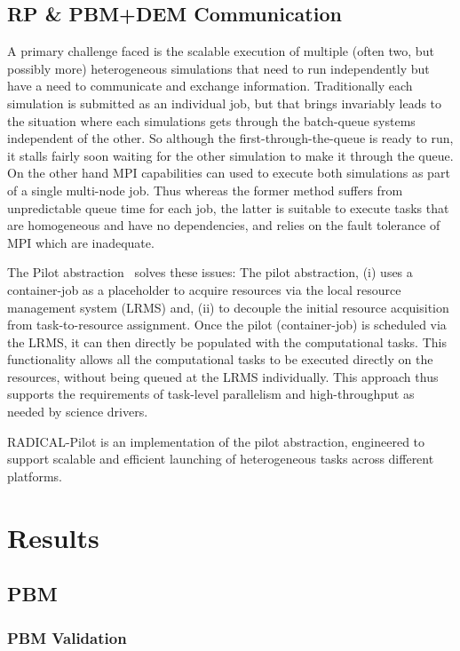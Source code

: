 \documentclass[preprint,11pt,authoryear]{elsarticle}
\begin{document}
	  
	  \subsection{RP \& PBM+DEM Communication}
	

A primary challenge faced is the scalable execution of multiple (often two,
but possibly more) heterogeneous simulations that need to run independently
but have a need to communicate and exchange information. Traditionally each
simulation is submitted as an individual job, but that brings invariably leads
to the situation where each simulations gets through the batch-queue systems
independent of the other. So although the first-through-the-queue is ready to
run, it stalls fairly soon waiting for the other simulation to make it through
the queue.  On the other hand MPI capabilities can used to  execute both
simulations as part of a single multi-node job.  Thus whereas the former
method suffers from unpredictable queue time for each job, the latter is
suitable to execute tasks that are homogeneous and have no dependencies, and
relies on the fault tolerance of MPI which are inadequate.


The Pilot abstraction~\cite{review_pilotreview} solves these issues:  The
pilot abstraction, (i) uses a container-job as a placeholder to acquire
resources via the local resource management system (LRMS) and,  (ii) to
decouple the initial resource acquisition from task-to-resource assignment.
Once the pilot (container-job) is scheduled via the LRMS, it can then directly
be populated with the computational tasks. This functionality allows all the
computational tasks to be executed directly on the resources, without being
queued at the LRMS individually. This approach thus supports the requirements
of task-level parallelism and high-throughput as needed by science drivers.

RADICAL-Pilot is an implementation of the pilot abstraction, engineered to
support scalable and efficient launching of heterogeneous tasks
across different platforms.

	
	  
	\section{Results}
	  \subsection{PBM}
	    \subsubsection{PBM Validation}
	      
\end{document}
